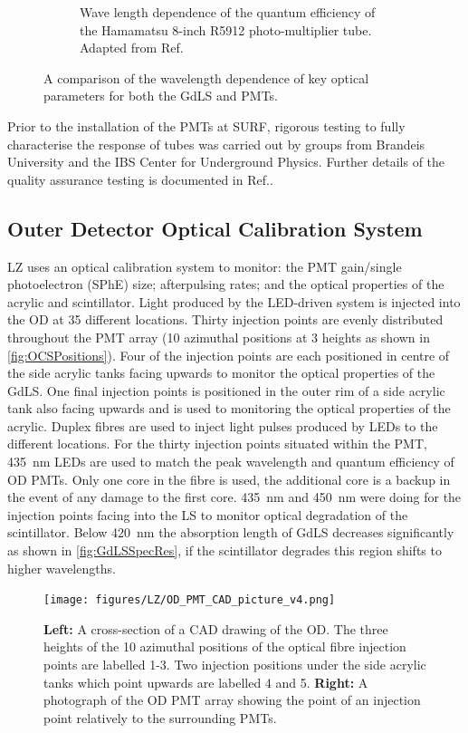 \begin{figure}
\begin{subfigure}{0.47\textwidth}
         \caption{Wave length dependence of the quantum efficiency of the Hamamatsu 8-inch R5912 photo-multiplier tube. Adapted from Ref.\cite{HamamatsuR5912}}
         \label{fig:ODPMTQE}
     \end{subfigure}
     \caption{A comparison of the wavelength dependence of key optical parameters for both the GdLS and PMTs.}
     \label{fig:ODPMTSpecRes}
\end{figure}
Prior to the installation of the PMTs at SURF, rigorous testing to fully characterise the response of tubes was carried out by groups from Brandeis University and the IBS Center for Underground Physics. Further details of the quality assurance testing is documented in Ref.\cite{lkorley:thesis}.

\subsection{Outer Detector Optical Calibration System}
LZ uses an optical calibration system to monitor: the PMT gain/single photoelectron (SPhE) size; afterpulsing rates; and the optical properties of the acrylic and scintillator. Light produced by the LED-driven system is injected into the OD at 35 different locations. Thirty injection points are evenly distributed throughout the PMT array  (10 azimuthal positions at 3 heights as shown in \autoref{fig:OCSPositions}). Four of the injection points are each positioned in centre of the side acrylic tanks facing upwards to monitor the optical properties of the GdLS. One final injection points is positioned in the outer rim of a side acrylic tank also facing upwards and is used to monitoring the optical properties of the acrylic.
Duplex fibres are used to inject light pulses produced by LEDs to the different locations. For the thirty injection points situated within the PMT, 435~nm LEDs are used to match the peak wavelength and quantum efficiency of OD PMTs. Only one core in the fibre is used, the additional core is a backup in the event of any damage to the first core. 435~nm and 450~nm were doing for the injection points facing into the LS to monitor optical degradation of the scintillator. Below 420~nm the absorption length of GdLS decreases significantly as shown in \autoref{fig:GdLSSpecRes}, if the scintillator degrades this region shifts to higher wavelengths.

\begin{figure}
    \centering
    \texttt{[image: figures/LZ/OD\_PMT\_CAD\_picture\_v4.png]}
    \caption{\textbf{Left:} A cross-section of a CAD drawing of the OD. The three  heights of the 10 azimuthal positions of the optical fibre injection points are labelled 1-3. Two injection positions under the side acrylic tanks which point upwards are labelled 4 and 5. \textbf{Right:} A photograph of the OD PMT array showing the point of an injection point relatively to the surrounding PMTs.}
    \label{fig:OCSPositions}
\end{figure}


